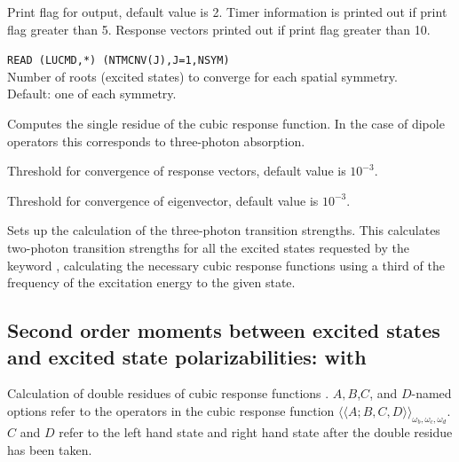 \begin{description}
\item{}
Print flag for output, default value is 2. Timer information is printed
out if print flag greater than 5. Response vectors printed out if
print flag greater than 10.

\item{}
\verb|READ (LUCMD,*) (NTMCNV(J),J=1,NSYM)|\\
Number of roots (excited states) to converge for each spatial symmetry. \\
Default: one of each symmetry.

\item{}
Computes the single residue of the cubic
response function.
In the case of dipole operators this corresponds to
three-photon absorption.

\item{}
Threshold for convergence of response vectors, default value is $10^{-3}$.

\item{}
Threshold for convergence of eigenvector, default value is $10^{-3}$.

\item{}
Sets up the calculation of the three-photon transition strengths. This
calculates two-photon transition strengths for all the excited states
requested by the keyword , calculating the necessary
cubic response functions using  a third of the frequency of the
excitation energy to the given state.

\end{description}


\subsection{Second order moments between excited states and excited state polarizabilities:
 with }
Calculation of double residues of
cubic response functions
\cite{pndjovhacpl242,djpnhajcp105,pndjhapdkrthhkcpl253}.
$A,B$,$C$, and $D$-named options refer to the operators in the cubic
response function
$\langle\!\langle A;B,C,D \rangle\!\rangle_{\omega_b,\omega_c,\omega_d}$.
$C$ and $D$ refer to the left hand state and right hand state
after the double residue has been taken.

